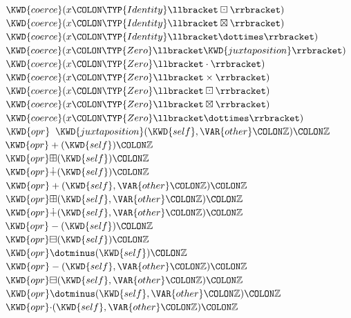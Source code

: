 \begin{Fortress}
\(  \KWD{coerce}(x\COLON \TYP{Identity}\llbracket\boxdot\rrbracket)\)\\
\(  \KWD{coerce}(x\COLON \TYP{Identity}\llbracket\boxtimes\rrbracket)\)\\
\(  \KWD{coerce}(x\COLON \TYP{Identity}\llbracket\dottimes\rrbracket)\)\\
\(  \KWD{coerce}(x\COLON \TYP{Zero}\llbracket\KWD{juxtaposition}\rrbracket)\)\\
\(  \KWD{coerce}(x\COLON \TYP{Zero}\llbracket\cdot\rrbracket)\)\\
\(  \KWD{coerce}(x\COLON \TYP{Zero}\llbracket\times\rrbracket)\)\\
\(  \KWD{coerce}(x\COLON \TYP{Zero}\llbracket\boxdot\rrbracket)\)\\
\(  \KWD{coerce}(x\COLON \TYP{Zero}\llbracket\boxtimes\rrbracket)\)\\
\(  \KWD{coerce}(x\COLON \TYP{Zero}\llbracket\dottimes\rrbracket)\)\\
\(  \KWD{opr}\;\;\KWD{juxtaposition}(\KWD{self}, \VAR{other}\COLON \mathbb{Z})\COLON \mathbb{Z}\)\\
\(  \KWD{opr} +(\KWD{self})\COLON \mathbb{Z}\)\\
\(  \KWD{opr} \mathord{\boxplus}(\KWD{self})\COLON \mathbb{Z}\)\\
\(  \KWD{opr} \mathord{\dotplus}(\KWD{self})\COLON \mathbb{Z}\)\\
\(  \KWD{opr} +(\KWD{self}, \VAR{other}\COLON \mathbb{Z})\COLON \mathbb{Z}\)\\
\(  \KWD{opr} \mathord{\boxplus}(\KWD{self}, \VAR{other}\COLON \mathbb{Z})\COLON \mathbb{Z}\)\\
\(  \KWD{opr} \mathord{\dotplus}(\KWD{self}, \VAR{other}\COLON \mathbb{Z})\COLON \mathbb{Z}\)\\
\(  \KWD{opr} -(\KWD{self})\COLON \mathbb{Z}\)\\
\(  \KWD{opr} \mathord{\boxminus}(\KWD{self})\COLON \mathbb{Z}\)\\
\(  \KWD{opr} \mathord{\dotminus}(\KWD{self})\COLON \mathbb{Z}\)\\
\(  \KWD{opr} -(\KWD{self}, \VAR{other}\COLON \mathbb{Z})\COLON \mathbb{Z}\)\\
\(  \KWD{opr} \mathord{\boxminus}(\KWD{self}, \VAR{other}\COLON \mathbb{Z})\COLON \mathbb{Z}\)\\
\(  \KWD{opr} \mathord{\dotminus}(\KWD{self}, \VAR{other}\COLON \mathbb{Z})\COLON \mathbb{Z}\)\\
\(  \KWD{opr} \mathord{\cdot}(\KWD{self}, \VAR{other}\COLON \mathbb{Z})\COLON \mathbb{Z}\)\\

\end{Fortress}
